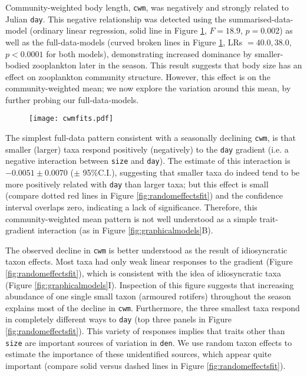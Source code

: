 \documentclass[12pt]{ecology}
\begin{document}
Community-weighted body length, \texttt{cwm}, was negatively and strongly related to Julian \texttt{day}.  This negative relationship was detected using the summarised-data-model (ordinary linear regression, solid line in Figure \ref{fig:cwmfits}, $F = 18.9$, $p = 0.002$) as well as the full-data-models (curved broken lines in Figure \ref{fig:cwmfits}, LRs $= 40.0, 38.0$, $p < 0.0001$ for both models), demonstrating increased dominance by smaller-bodied zooplankton later in the season.  This result suggests that body size has an effect on zooplankton community structure.  However, this effect is on the community-weighted mean; we now explore the variation around this mean, by further probing our full-data-models.   %

\begin{figure}
\caption[The relationship between community-weighted mean body length and day-of-year, with the fitted values of three models (Eqs. \ref{eq:sdm}, \ref{eq:fdmnointeraction}, \ref{eq:fdminteraction}).]{}%
\texttt{[image: cwmfits.pdf]}
\label{fig:cwmfits}
\end{figure}

The simplest full-data pattern consistent with a seasonally declining \texttt{cwm}, is that smaller (larger) taxa respond positively (negatively) to the \texttt{day} gradient (i.e. a negative interaction between \texttt{size} and \texttt{day}).  The estimate of this interaction is $-0.0051 \pm 0.0070$ ($\pm$ 95\%C.I.), suggesting that smaller taxa do indeed tend to be more positively related with \texttt{day} than larger taxa; but this effect is small (compare dotted red lines in Figure \ref{fig:randomeffectsfit}) and the confidence interval overlaps zero, indicating a lack of significance.  Therefore, this community-weighted mean pattern is not well understood as a simple trait-gradient interaction (as in Figure \ref{fig:graphicalmodels}B).

The observed decline in \texttt{cwm} is better understood as the result of idiosyncratic taxon effects.  Most taxa had only weak linear responses to the gradient (Figure \ref{fig:randomeffectsfit}), which is consistent with the idea of idiosyncratic taxa (Figure \ref{fig:graphicalmodels}I).  Inspection of this figure suggests that increasing abundance of one single small taxon (armoured rotifers) throughout the season explains most of the decline in \texttt{cwm}.  Furthermore, the three smallest taxa respond in completely different ways to \texttt{day} (top three panels in Figure \ref{fig:randomeffectsfit}).  This variety of responses implies that traits other than \texttt{size} are important sources of variation in \texttt{den}.  We use random taxon effects to estimate the importance of these unidentified sources, which appear quite important (compare solid versus dashed lines in Figure \ref{fig:randomeffectsfit}).
   
\end{document}
